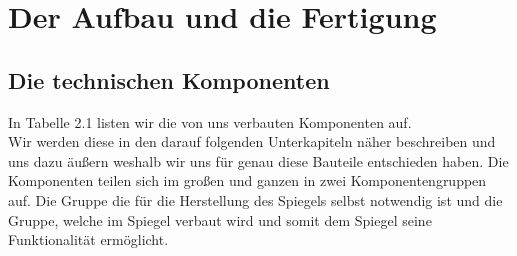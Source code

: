\chapter{Der Aufbau und die Fertigung}
\label{chapter:kap1}
\section{Die technischen Komponenten}
In Tabelle 2.1 listen wir die von uns verbauten Komponenten auf. \\
Wir werden diese in den darauf folgenden Unterkapiteln näher beschreiben und uns dazu äußern weshalb wir uns für genau diese Bauteile entschieden haben. Die Komponenten teilen sich im großen und ganzen in zwei Komponentengruppen auf. Die Gruppe die für die Herstellung des Spiegels selbst notwendig ist und die Gruppe, welche im Spiegel verbaut wird und somit dem Spiegel seine Funktionalität ermöglicht.
